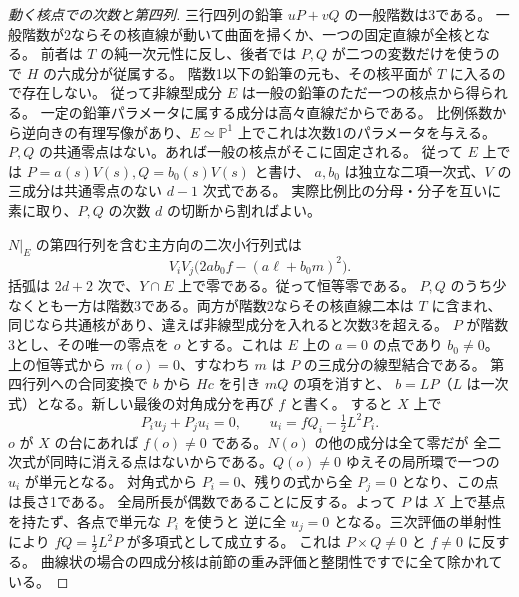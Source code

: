 \begin{proof}[動く核点での次数と第四列]
三行四列の鉛筆 $uP+vQ$ の一般階数は3である。
一般階数が2ならその核直線が動いて曲面を掃くか、一つの固定直線が全核となる。
前者は $T$ の純一次元性に反し、後者では $P,Q$ が二つの変数だけを使うので $H$ の六成分が従属する。
階数1以下の鉛筆の元も、その核平面が $T$ に入るので存在しない。
従って非線型成分 $E$ は一般の鉛筆のただ一つの核点から得られる。
一定の鉛筆パラメータに属する成分は高々直線だからである。
比例係数から逆向きの有理写像があり、$E\simeq\mathbb P^1$ 上でこれは次数1のパラメータを与える。
$P,Q$ の共通零点はない。あれば一般の核点がそこに固定される。
従って $E$ 上では $P=a(s)V(s), Q=b_0(s)V(s)$ と書け、
$a,b_0$ は独立な二項一次式、$V$ の三成分は共通零点のない $d-1$ 次式である。
実際比例比の分母・分子を互いに素に取り、$P,Q$ の次数 $d$ の切断から割ればよい。

$N|_E$ の第四行列を含む主方向の二次小行列式は
\[
 V_iV_j\big(2ab_0 f-(a\ell+b_0m)^2\big).
\]
括弧は $2d+2$ 次で、$Y\cap E$ 上で零である。従って恒等零である。
$P,Q$ のうち少なくとも一方は階数3である。両方が階数2ならその核直線二本は
$T$ に含まれ、同じなら共通核があり、違えば非線型成分を入れると次数3を超える。
$P$ が階数3とし、その唯一の零点を $o$ とする。これは $E$ 上の $a=0$ の点であり
$b_0\ne0$。上の恒等式から $m(o)=0$、すなわち $m$ は $P$ の三成分の線型結合である。
第四行列への合同変換で $b$ から $Hc$ を引き $mQ$ の項を消すと、
$b=L P$（$L$ は一次式）となる。新しい最後の対角成分を再び $f$ と書く。
すると $X$ 上で
\[
 P_i u_j+P_j u_i=0,\qquad
          u_i=fQ_i-\tfrac12 L^2 P_i .
\]
$o$ が $X$ の台にあれば $f(o)\ne0$ である。$N(o)$ の他の成分は全て零だが
全二次式が同時に消える点はないからである。$Q(o)\ne0$ ゆえその局所環で一つの $u_i$ が単元となる。
対角式から $P_i=0$、残りの式から全 $P_j=0$ となり、この点は長さ1である。
全局所長が偶数であることに反する。よって $P$ は $X$ 上で基点を持たず、各点で単元な $P_i$ を使うと
逆に全 $u_j=0$ となる。三次評価の単射性により $fQ=\tfrac12L^2P$ が多項式として成立する。
これは $P\times Q\ne0$ と $f\ne0$ に反する。
曲線状の場合の四成分核は前節の重み評価と整閉性ですでに全て除かれている。
\end{proof}
